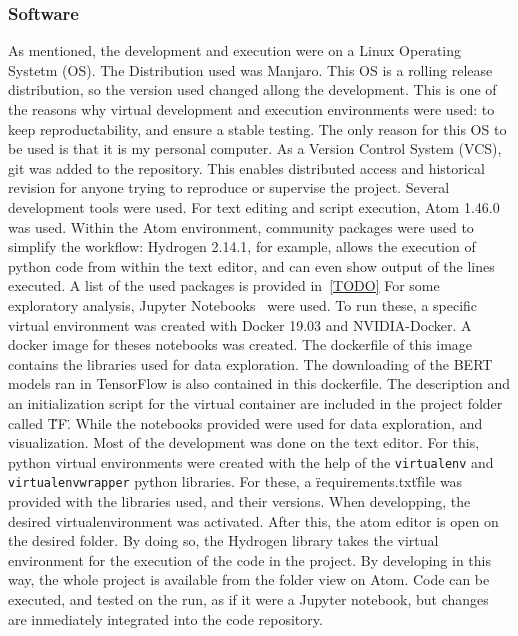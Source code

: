 \subsubsection{Software}\label{subs:Software}
As mentioned, the development and execution were on a Linux Operating Systetm (OS). The Distribution used was Manjaro. This OS is a rolling release distribution, so the version used changed allong the development. This is one of the reasons why virtual development and execution environments were used: to keep reproductability, and ensure a stable testing. The only reason for this OS to be used is that it is my personal computer.
As a Version Control System (VCS), git was added to the repository. This enables distributed access and historical revision for anyone trying to reproduce or supervise the project.
Several development tools were used. For text editing and script execution, Atom 1.46.0 was used. Within the Atom environment, community packages were used to simplify the workflow: Hydrogen 2.14.1, for example, allows the execution of python code from within the text editor, and can even show output of the lines executed. A list of the used packages is provided in~\ref{TODO}
For some exploratory analysis, Jupyter Notebooks~\cite{kluyver2016jupyter} were used. To run these, a specific virtual environment was created with Docker 19.03 and NVIDIA-Docker. A docker image for theses notebooks was created. The dockerfile of this image contains the libraries used for data exploration. The downloading of the BERT models ran in TensorFlow is also contained in this dockerfile. The description and an initialization script for the virtual container are included in the project folder called \"TF\".
While the notebooks provided were used for data exploration, and visualization. Most of the development was done on the text editor. For this, python virtual environments were created with the help of the \lstinline{virtualenv} and \lstinline{virtualenvwrapper} python libraries. For these, a \"requirements.txt\" file was provided with the libraries used, and their versions.
When developping, the desired virtualenvironment was activated. After this, the atom editor is open on the desired folder. By doing so, the Hydrogen library takes the virtual environment for the execution of the code in the project.
By developing in this way, the whole project is available from the folder view on Atom. Code can be executed, and tested on the run, as if it were a Jupyter notebook, but changes are inmediately integrated into the code repository.
